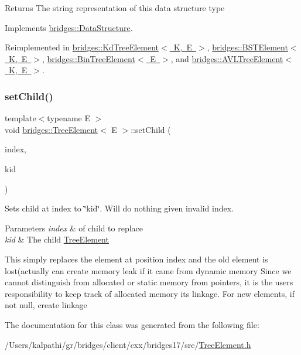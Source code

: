 \begin{DoxyReturn}{Returns}
The string representation of this data structure type 
\end{DoxyReturn}


Implements \mbox{\hyperlink{classbridges_1_1_data_structure_a957a63b106e340bc753620c650632bdc}{bridges\+::\+Data\+Structure}}.



Reimplemented in \mbox{\hyperlink{classbridges_1_1_kd_tree_element_acdd8f989986b7dd42cfacec73cf52dcb}{bridges\+::\+Kd\+Tree\+Element$<$ K, E $>$}}, \mbox{\hyperlink{classbridges_1_1_b_s_t_element_af3843873c508c24f90b6e73a6f490bf8}{bridges\+::\+B\+S\+T\+Element$<$ K, E $>$}}, \mbox{\hyperlink{classbridges_1_1_bin_tree_element_a0a154f68ef0a58715e598a6ef92b9e59}{bridges\+::\+Bin\+Tree\+Element$<$ E $>$}}, and \mbox{\hyperlink{classbridges_1_1_a_v_l_tree_element_a24c005f8e07a7a2682225cead3b7e364}{bridges\+::\+A\+V\+L\+Tree\+Element$<$ K, E $>$}}.

\mbox{\label{classbridges_1_1_tree_element_aa12cb7cb4b4f559bdf0967872b0a6e7d}} 
\subsubsection{\texorpdfstring{set\+Child()}{setChild()}}
{\footnotesize\ttfamily template$<$typename E $>$ \\
void \mbox{\hyperlink{classbridges_1_1_tree_element}{bridges\+::\+Tree\+Element}}$<$ E $>$\+::set\+Child (\begin{DoxyParamCaption}\item[{const size\+\_\+t \&}]{index,  }\item[{\mbox{\hyperlink{classbridges_1_1_tree_element}{Tree\+Element}}$<$ E $>$ $\ast$}]{kid }\end{DoxyParamCaption})\hspace{0.3cm}{\ttfamily [inline]}}

Sets child at index to \char`\"{}kid\char`\"{}. Will do nothing given invalid index.


\begin{DoxyParams}{Parameters}
{\em index} & of child to replace \\
\hline
{\em kid} & The child \mbox{\hyperlink{classbridges_1_1_tree_element}{Tree\+Element}} \\
\hline
\end{DoxyParams}
This simply replaces the element at position index and the old element is lost(actually can create memory leak if it came from dynamic memory Since we cannot distinguish from allocated or static memory from pointers, it is the user\textquotesingle{}s responsibility to keep track of allocated memory its linkage. For new elements, if not null, create linkage

The documentation for this class was generated from the following file\+:\begin{DoxyCompactItemize}
\item 
/\+Users/kalpathi/gr/bridges/client/cxx/bridges17/src/\mbox{\hyperlink{_tree_element_8h}{Tree\+Element.\+h}}\end{DoxyCompactItemize}

